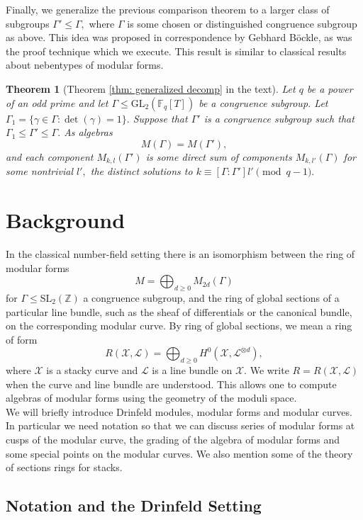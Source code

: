 \documentclass[11pt]{amsart}
\newtheorem{theorem}{Theorem}[section]
\theoremstyle{definition}
\numberwithin{equation}{section}
\newcommand{\GL}{\mathrm{GL}} 	%
\newcommand{\SL}{\mathrm{SL}} 	%
\newcommand{\sL}{\mathscr{L}}		%
\newcommand{\sX}{\mathscr{X}}		%
\newcommand{\bbF}{\mathbb{F}}		%
\newcommand{\bbZ}{\mathbb{Z}}		%
\begin{document}
		Finally, we generalize the previous comparison theorem to a larger class of subgroups $\Gamma'\leq \Gamma,$ where $\Gamma$ is some chosen or distinguished congruence subgroup as above. This idea was proposed in correspondence by Gebhard B\"ockle, as was the proof technique which we execute. This result is similar to classical results about nebentypes of modular forms. 
		\begin{theorem}[Theorem \ref{thm: generalized decomp} in the text]
			Let $q$ be a power of an odd prime and let $\Gamma\leq \GL_2(\bbF_q[T])$ be a congruence subgroup. Let $\Gamma_1=\{\gamma\in \Gamma: \det(\gamma)=1\}.$ Suppose that $\Gamma'$ is a congruence subgroup such that $\Gamma_1\leq \Gamma'\leq \Gamma.$ As algebras
			\[M(\Gamma)=M(\Gamma'),\] and each component $M_{k,l}(\Gamma')$ is some direct sum of components $M_{k,l'}(\Gamma)$ for some nontrivial $l',$ the distinct solutions to $k\equiv [\Gamma:\Gamma']l'\pmod{q-1}.$
		\end{theorem}
		
		\section{Background} %
		
		In the classical number-field setting there is an isomorphism between the ring of modular forms 
		\[M = \bigoplus_{d\geq 0} M_{2d}(\Gamma)\]
		for $\Gamma\leq \SL_2(\bbZ)$ a congruence subgroup, and the ring of global sections of a particular line bundle, such as the sheaf of differentials or the canonical bundle, on the corresponding modular curve. By ring of global sections, we mean a ring of form 
		\[R(\sX,\sL)=\bigoplus_{d\geq 0}H^0(\sX,\sL^{\otimes d}),\]
		where $\sX$ is a stacky curve and $\sL$ is a line bundle on $\sX.$ We write $R=R(\sX,\sL)$ when the curve and line bundle are understood.
		This allows one to compute algebras of modular forms using the geometry of the moduli space.\\
		
		We will briefly introduce Drinfeld modules, modular forms and modular  curves. In particular we need notation so that we can discuss series of modular forms at cusps of the modular curve, the grading of the algebra of modular forms and some special points on the modular curves. We also mention some of the theory of sections rings for stacks.  
		
		\subsection{Notation and the Drinfeld Setting}
		
\end{document}
